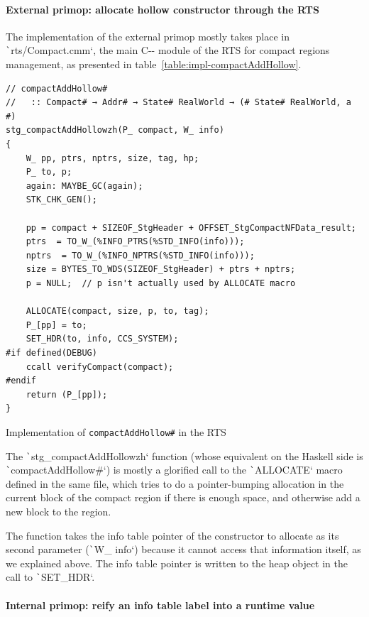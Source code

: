\documentclass[english]{jflart}
\begin{document}
\paragraph{External primop: allocate hollow constructor through the RTS}

The implementation of the external primop mostly takes place in \texttt`rts/Compact.cmm`, the main C-{}- module of the RTS for compact regions management, as presented in table~\ref{table:impl-compactAddHollow}.

\begin{table}[t]
\small
\begin{verbatim}
// compactAddHollow#
//   :: Compact# → Addr# → State# RealWorld → (# State# RealWorld, a #)
stg_compactAddHollowzh(P_ compact, W_ info)
{
    W_ pp, ptrs, nptrs, size, tag, hp;
    P_ to, p;
    again: MAYBE_GC(again);
    STK_CHK_GEN();

    pp = compact + SIZEOF_StgHeader + OFFSET_StgCompactNFData_result;
    ptrs  = TO_W_(%INFO_PTRS(%STD_INFO(info)));
    nptrs  = TO_W_(%INFO_NPTRS(%STD_INFO(info)));
    size = BYTES_TO_WDS(SIZEOF_StgHeader) + ptrs + nptrs;
    p = NULL;  // p isn't actually used by ALLOCATE macro

    ALLOCATE(compact, size, p, to, tag);
    P_[pp] = to;
    SET_HDR(to, info, CCS_SYSTEM);
#if defined(DEBUG)
    ccall verifyCompact(compact);
#endif
    return (P_[pp]);
}
\end{verbatim}
\caption{Implementation of \texttt{compactAddHollow\#} in the RTS}
\label{table:impl-compactAddHollow}
\end{table}

The \texttt`stg_compactAddHollowzh` function (whose equivalent on the Haskell side is \texttt`compactAddHollow#`) is mostly a glorified call to the \texttt`ALLOCATE` macro defined in the same file, which tries to do a pointer-bumping allocation in the current block of the compact region if there is enough space, and otherwise add a new block to the region.

The function takes the info table pointer of the constructor to allocate as its second parameter (\texttt`W_ info`) because it cannot access that information itself, as we explained above. The info table pointer is written to the heap object in the call to \texttt`SET_HDR`.

\paragraph{Internal primop: reify an info table label into a runtime value}
\end{document}
